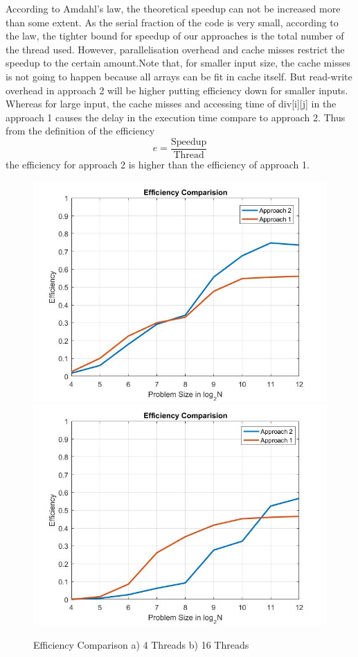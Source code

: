 \documentclass{article}
\begin{document}
According to Amdahl's law, the theoretical speedup can not be increased more than some extent. As the serial fraction of the code is very small, according to the law, the tighter bound for speedup of our approaches is the total number of the thread used. However, parallelisation overhead and cache misses restrict the speedup to the certain amount.Note that, for smaller input size, the cache misses is not going to happen because all arrays can be fit in cache itself. But read-write overhead in approach 2 will be higher putting efficiency down for smaller inputs. Whereas for large input, the cache misses and accessing time of div[i][j] in the approach 1 causes the delay in the execution time compare to approach 2. Thus from the definition of the efficiency $$e = \frac{\mathrm{Speedup}}{\mathrm{Thread}}$$ the efficiency for approach 2 is higher than the efficiency of approach 1. 
\begin{figure}[!h]
    \centering
    \includegraphics[scale = 0.3]{eff_4.jpg}
    \includegraphics[scale = 0.3]{eff_16.jpg}
    \caption{Efficiency Comparison a) 4 Threads b) 16 Threads}
\end{figure}
\end{document}
